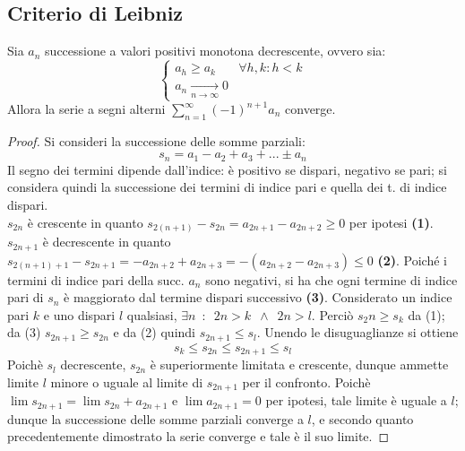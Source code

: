 \documentclass[10pt, oneside]{book}
\theoremstyle{plain}
\begin{document}
\subsection{Criterio di Leibniz}
\hypertarget{leibniz}{
\begin{ther}
Sia $a_n$ successione a valori positivi monotona decrescente, ovvero sia:
\begin{equation*}
    \begin{cases}
    a_{h} \geq a_{k} & \forall h, k : h < k\\
    a_n \xrightarrow[n \rightarrow \infty]{} 0
    \end{cases}
\end{equation*}
Allora la serie a segni alterni $\displaystyle \sum_{n=1}^{\infty} (-1)^{n+1} a_n$ converge.
\end{ther}
}
\begin{proof}
Si consideri la successione delle somme parziali:
\[s_n = a_1 - a_2 + a_3 + ... \pm a_n\]
Il segno dei termini dipende dall'indice: è positivo se dispari, negativo se pari; si considera quindi la successione dei termini di indice pari e quella dei t. di indice dispari.
\\$s_{2n}$ è crescente in quanto $s_{2(n+1)} - s_{2n} = a_{2n+1} - a_{2n+2} \geq 0$ per ipotesi \textbf{(1)}.
\\$s_{2n+1}$ è decrescente in quanto $s_{2(n+1)+1} - s_{2n+1} = - a_{2n+2} + a_{2n+3} = - (a_{2n+2} - a_{2n+3}) \leq 0$ \textbf{(2)}. Poiché i termini di indice pari della succ. $a_n$ sono negativi, si ha che ogni termine di indice pari di $s_n$ è maggiorato dal termine dispari successivo \textbf{(3)}. Considerato un indice pari $k$ e uno dispari $l$ qualsiasi, $\exists n \enspace : \enspace 2n > k \enspace \land \enspace 2n > l$. Perciò $s_2n \geq s_k$ da (1); da (3) $s_{2n+1} \geq s_{2n}$ e da (2) quindi $s_{2n+1} \leq s_l$. Unendo le disuguaglianze si ottiene
\[s_k \leq s_{2n} \leq s_{2n+1} \leq s_l\]
Poichè $s_l$ decrescente, $s_{2n}$ è superiormente limitata e crescente, dunque ammette limite $l$ minore o uguale al limite di $s_{2n+1}$ per il confronto. Poichè $\lim s_{2n+1} = \lim s_{2n} + a_{2n+1}$ e $\lim a_{2n+1} = 0$ per ipotesi, tale limite è uguale a $l$; dunque la successione delle somme parziali converge a $l$, e secondo quanto precedentemente dimostrato la serie converge e tale è il suo limite.
\end{proof}
\end{document}
